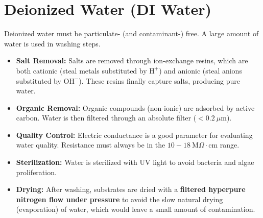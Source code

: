 \documentclass{report}
\begin{document}
\section{Deionized Water (DI Water)}

Deionized water must be particulate- (and contaminant-) free. A large amount of water is used in washing steps.

\begin{itemize}
    \item \textbf{Salt Removal:} Salts are removed through ion-exchange resins, which are both cationic (steal metals substituted by $\text{H}^+$) and anionic (steal anions substituted by $\text{OH}^-$). These resins finally capture salts, producing pure water.
    \item \textbf{Organic Removal:} Organic compounds (non-ionic) are adsorbed by active carbon. Water is then filtered through an absolute filter ($<0.2~\mu \text{m}$).
    \item \textbf{Quality Control:} Electric conductance is a good parameter for evaluating water quality. Resistance must always be in the $10-18~\text{M}\Omega \cdot \text{cm}$ range.
    \item \textbf{Sterilization:} Water is sterilized with UV light to avoid bacteria and algae proliferation.
    \item \textbf{Drying:} After washing, substrates are dried with a \textbf{filtered hyperpure nitrogen flow under pressure} to avoid the slow natural drying (evaporation) of water, which would leave a small amount of contamination.
\end{itemize}

\clearpage
\end{document}
